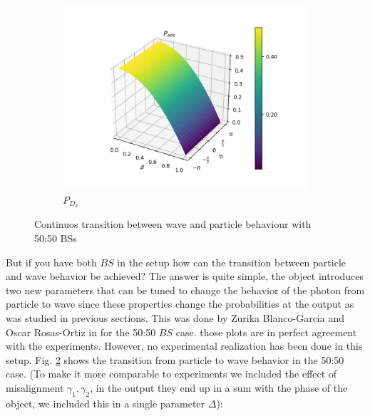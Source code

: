 \documentclass{book}
\begin{document}
\begin{figure}[H]
\begin{subfigure}[b]{0.30\linewidth}
\includegraphics[width=\linewidth]{images/pabs_2.png}
\caption{$P_{D_{2}}$ }
\label{fig:BS1}
\end{subfigure}
\caption{Continuos transition between wave and particle behaviour with 50:50 BSs}
\label{transzuri}
\end{figure}

But if you have both $BS$ in the setup how can the transition between particle and wave behavior be achieved? The answer is quite simple, the object introduces two new parameters that can be tuned to change the behavior of the photon from particle to wave since these properties change the probabilities at the output as was studied in previous sections. This was done by Zurika Blanco-Garcia and Oscar Rosas-Ortiz in \cite{azuri} for the 50:50 $BS$ case. those plots are in perfect agreement with the experiments. However, no experimental realization has been done in this setup. Fig. \ref{transzuri} shows the transition from particle to wave behavior in the 50:50 case. (To make it more comparable to experiments we included the effect of misalignment $\gamma_{1},\gamma_{2}$, in the output they end up in a sum with the phase of the object, we included this in a single parameter $\Delta$):
\end{document}
